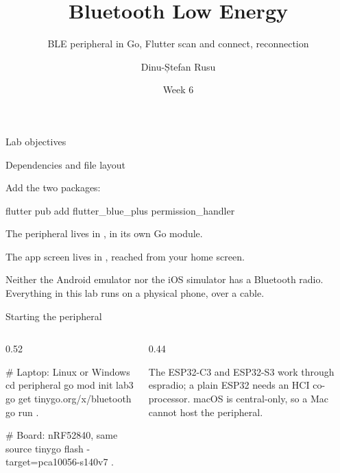 \documentclass[10pt,aspectratio=169,t]{beamer}
\title{Bluetooth Low Energy}
\subtitle{BLE peripheral in Go, Flutter scan and connect, reconnection}
\author{Dinu-Ștefan Rusu}
\date{Week 6}
\begin{document}
\titleframe

\begin{frame}[eyebrow=Today]{Lab objectives}
  \vskip 2mm
  \begin{grid}[2]
  \end{grid}
  \vskip 6mm
\end{frame}

\begin{frame}[fragile,eyebrow=Setup]{Dependencies and file layout}
  \begin{steps}
    \item Add the two packages:
\begin{shell}
flutter pub add flutter_blue_plus permission_handler
\end{shell}
    \item The peripheral lives in , in its own Go module.
    \item The app screen lives in , reached from your home screen.
  \end{steps}
  \begin{warning}
    Neither the Android emulator nor the iOS simulator has a Bluetooth radio. Everything in this lab runs on a physical phone, over a cable.
  \end{warning}
\end{frame}

\begin{frame}[embedded,fragile,eyebrow=Peripheral]{Starting the peripheral}
  \begin{columns}[T]
    \begin{column}{0.52\textwidth}
\begin{shell}
# Laptop: Linux or Windows
cd peripheral
go mod init lab3
go get tinygo.org/x/bluetooth
go run .

# Board: nRF52840, same source
tinygo flash -target=pca10056-s140v7 .
\end{shell}
    \end{column}
    \begin{column}{0.44\textwidth}
      \vskip 2mm
      \begin{warning}
        The ESP32-C3 and ESP32-S3 work through espradio; a plain ESP32 needs an HCI co-processor. macOS is central-only, so a Mac cannot host the peripheral.
      \end{warning}
    \end{column}
  \end{columns}
\end{frame}
\end{document}
